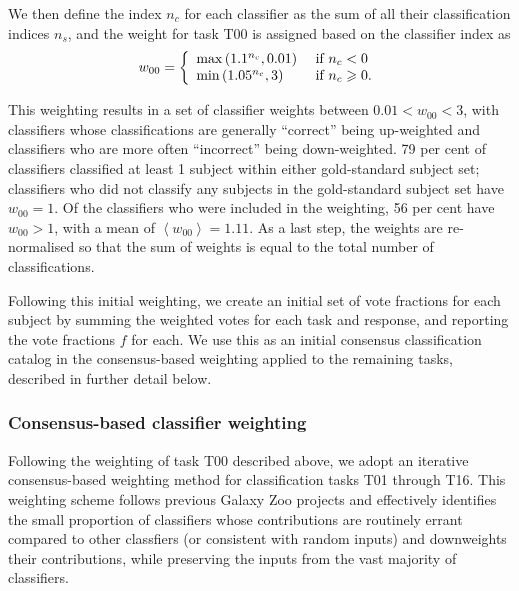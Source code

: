 \documentclass[useAMS,usenatbib]{mn2e}
\begin{document}
{We then define the index $n_c$ for each classifier as the sum of all their classification indices $n_s$, and the weight for task T00 is assigned based on the classifier index as
\begin{equation}
   w_{00}= \left\{
    \begin{array}{l l}
      \max \left(1.1^{n_c}, 0.01\right)       & \text{ if } n_c < 0 \\
      \min \left(1.05^{n_c}, 3 \right) & \text{ if } n_c \geq 0.\\
    \end{array} \right.
    \label{eqn-seedweight}
 \end{equation}

This weighting results in a set of classifier weights between $0.01 < w_{00} < 3$, with classifiers whose classifications are generally ``correct'' being up-weighted and classifiers who are more often ``incorrect'' being down-weighted.  79 per cent of classifiers classified at least 1 subject within either gold-standard subject set; classifiers who did not classify any subjects in the gold-standard subject set have $w_{00} = 1$. Of the classifiers who were included in the weighting, 56 per cent have $w_{00} > 1$, with a mean of $\left< w_{00} \right> = 1.11$. As a last step, the weights are re-normalised so that the sum of weights is equal to the total number of classifications.

Following this initial weighting, we create an initial set of vote fractions for each subject by summing the weighted votes for each task and response, and reporting the vote fractions $f$ for each. We use this as an initial consensus classification catalog in the consensus-based weighting applied to the remaining tasks, described in further detail below.

\subsubsection{Consensus-based classifier weighting}

Following the weighting of task T00 described above, we adopt an iterative consensus-based weighting method for classification tasks T01 through T16. This weighting scheme follows previous Galaxy Zoo projects and effectively identifies the small proportion of classifiers whose contributions are routinely errant compared to other classfiers (or consistent with random inputs) and downweights their contributions, while preserving the inputs from the vast majority of classifiers.

}
\end{document}
